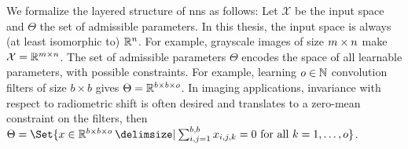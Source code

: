We formalize the layered structure of \glspl{nn} as follows:
Let \( \mathcal{X} \) be the input space and \( \Theta \) the set of admissible parameters.
In this thesis, the input space is always (at least isomorphic to) \( \mathbb{R}^n \).
For example, grayscale images of size \( m \times n \) make \( \mathcal{X} = \mathbb{R}^{m\times n} \).
The set of admissible parameters \( \Theta \) encodes the space of all learnable parameters, with possible constraints.
For example, learning \( o \in \mathbb{N} \) convolution filters of size \( b \times b \) gives \( \Theta = \mathbb{R}^{b \times b \times o} \).
In imaging applications, invariance with respect to radiometric shift is often desired and translates to a zero-mean constraint on the filters, then \( \Theta = \Set{x \in \R^{b \times b \times \NumExperts} \given \sum_{i, j=1}^{b,b} x_{i, j, k} = \num{0}\ \text{for all}\ k = \num{1}, \dotsc, \NumExperts} \).

